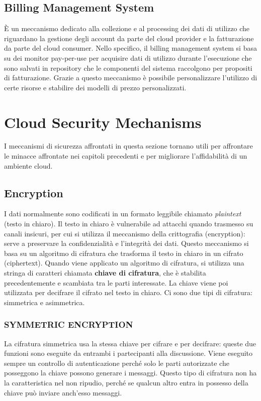 \subsection{Billing Management System}
È un meccanismo dedicato alla collezione e al processing dei dati di utilizzo che riguardano la gestione degli account da parte del cloud provider e la fatturazione da parte del cloud consumer. Nello specifico, il billing management system si basa su dei monitor pay-per-use per acquisire dati di utilizzo durante l'esecuzione che sono salvati in repository che le componenti del sistema raccolgono per propositi di fatturazione. Grazie a questo meccanismo è possibile personalizzare l'utilizzo di certe risorse e stabilire dei modelli di prezzo personalizzati.


\section{Cloud Security Mechanisms}
I meccanismi di sicurezza affrontati in questa sezione tornano utili per affrontare le minacce affrontate nei capitoli precedenti e per migliorare l'affidabilità di un ambiente cloud. 

\subsection{Encryption}
I dati normalmente sono codificati in un formato leggibile chiamato \textit{plaintext} (testo in chiaro). Il testo in chiaro è vulnerabile ad attacchi quando trasmesso su canali insicuri, per cui si utilizza il meccanismo della crittografia (encryption): serve a preservare la confidenzialità e l'integrità dei dati. Questo meccanismo si basa su un algoritmo di cifratura che trasforma il testo in chiaro in un cifrato (ciphertext). Quando viene applicato un algoritmo di cifratura, si utilizza una stringa di caratteri chiamata \textbf{chiave di cifratura}, che è stabilita precedentemente e scambiata tra le parti interessate. La chiave viene poi utilizzata per decifrare il cifrato nel testo in chiaro. Ci sono due tipi di cifratura: simmetrica e asimmetrica.

\subsubsection{SYMMETRIC ENCRYPTION}
La cifratura simmetrica usa la stessa chiave per cifrare e per decifrare: queste due funzioni sono eseguite da entrambi i partecipanti alla discussione. Viene eseguito sempre un controllo di autenticazione perché solo le parti autorizzate che posseggono la chiave possono generare i messaggi. Questo tipo di cifratura non ha la caratteristica nel non ripudio, perché se qualcun altro entra in possesso della chiave può inviare anch'esso messaggi.

